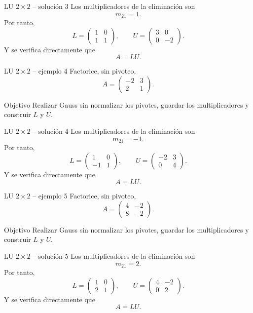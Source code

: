 \documentclass[aspectratio=169,10pt]{beamer}
\begin{document}
\begin{frame}{LU $2\times 2$ -- solución 3}
\small
Los multiplicadores de la eliminación son
\[
m_{21}=1.
\]
Por tanto,
\[
L=\begin{pmatrix}1 & 0\\1 & 1\end{pmatrix},\qquad U=\begin{pmatrix}3 & 0\\0 & -2\end{pmatrix}.
\]
Y se verifica directamente que
\[
\boxed{A=LU}.
\]
\end{frame}
\begin{frame}{LU $2\times 2$ -- ejemplo 4}
\small
Factorice, sin pivoteo,
\[
A=\begin{pmatrix}-2 & 3\\2 & 1\end{pmatrix}.
\]
\begin{block}{Objetivo}
Realizar Gauss sin normalizar los pivotes, guardar los multiplicadores y construir $L$ y $U$.
\end{block}
\end{frame}
\begin{frame}{LU $2\times 2$ -- solución 4}
\small
Los multiplicadores de la eliminación son
\[
m_{21}=-1.
\]
Por tanto,
\[
L=\begin{pmatrix}1 & 0\\-1 & 1\end{pmatrix},\qquad U=\begin{pmatrix}-2 & 3\\0 & 4\end{pmatrix}.
\]
Y se verifica directamente que
\[
\boxed{A=LU}.
\]
\end{frame}
\begin{frame}{LU $2\times 2$ -- ejemplo 5}
\small
Factorice, sin pivoteo,
\[
A=\begin{pmatrix}4 & -2\\8 & -2\end{pmatrix}.
\]
\begin{block}{Objetivo}
Realizar Gauss sin normalizar los pivotes, guardar los multiplicadores y construir $L$ y $U$.
\end{block}
\end{frame}
\begin{frame}{LU $2\times 2$ -- solución 5}
\small
Los multiplicadores de la eliminación son
\[
m_{21}=2.
\]
Por tanto,
\[
L=\begin{pmatrix}1 & 0\\2 & 1\end{pmatrix},\qquad U=\begin{pmatrix}4 & -2\\0 & 2\end{pmatrix}.
\]
Y se verifica directamente que
\[
\boxed{A=LU}.
\]
\end{frame}
\end{document}
